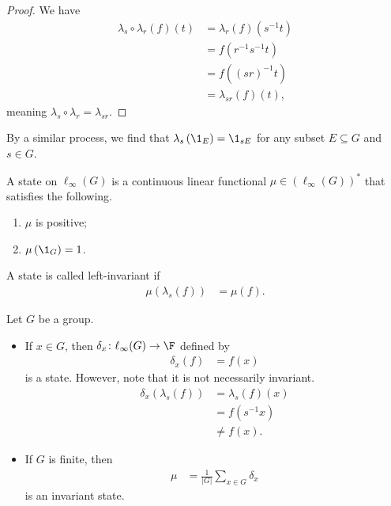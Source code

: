 \documentclass[10pt]{mypackage}
\begin{document}
\begin{proof}
  We have
  \begin{align*}
    \lambda_s\circ \lambda_r\left(f\right)\left(t\right) &= \lambda_r\left(f\right)\left(s^{-1}t\right)\\
                                                         &= f\left(r^{-1}s^{-1}t\right)\\
                                                         &= f\left(\left(sr\right)^{-1}t\right)\\
                                                         &= \lambda_{sr}\left(f\right)\left(t\right),
  \end{align*}
  meaning $\lambda_s\circ \lambda_r = \lambda_{sr}$.
\end{proof}
\begin{remark}
  By a similar process, we find that $\lambda_{s}\left(\1_{E}\right) = \1_{sE}$ for any subset $E\subseteq G$ and $s\in G$.
\end{remark}
\begin{definition}
  A state on $\ell_{\infty}\left(G\right)$ is a continuous linear functional $\mu\in \left(\ell_{\infty}\left(G\right)\right)^{\ast}$ that satisfies the following.
  \begin{enumerate}[(1)]
    \item $\mu$ is positive;
    \item $\mu\left(\1_{G}\right) = 1$.
  \end{enumerate}
  A state is called left-invariant if
  \begin{align*}
    \mu\left(\lambda_{s}\left(f\right)\right) &= \mu\left(f\right).
  \end{align*}
  
\end{definition}
\begin{example}
  Let $G$ be a group.
  \begin{itemize}
    \item If $x\in G$, then $\delta_{x}\colon \ell_{\infty}(G) \rightarrow \F$ defined by
      \begin{align*}
        \delta_{x}\left(f\right) &= f(x)
      \end{align*}
      is a state. However, note that it is not necessarily invariant.
      \begin{align*}
        \delta_{x}\left(\lambda_s\left(f\right)\right) &= \lambda_{s}\left(f\right)\left(x\right)\\
                                                       &= f\left(s^{-1}x\right)\\
                                                       &\neq f(x).
      \end{align*}
    \item If $G$ is finite, then
      \begin{align*}
        \mu &= \frac{1}{\left\vert G \right\vert} \sum_{x\in G}\delta_{x}
      \end{align*}
      is an invariant state.
  \end{itemize}
\end{example}
\end{document}
